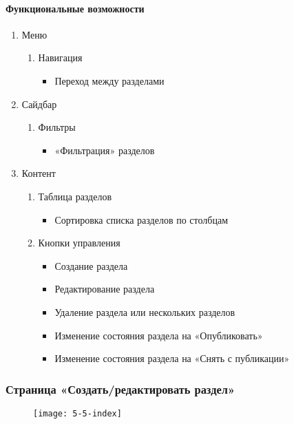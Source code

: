 \paragraph{Функциональные возможности}
\begin{enumerate}
	\item Меню
	\begin{enumerate}
		\item Навигация
		\begin{itemize}
			\item Переход между разделами
		\end{itemize}
	\end{enumerate}

	\item Сайдбар
	\begin{enumerate}
		\item Фильтры
		\begin{itemize}
			\item «Фильтрация» разделов
		\end{itemize}
	\end{enumerate}

	\item Контент
	\begin{enumerate}
		\item Таблица разделов
		\begin{itemize}
			\item Сортировка списка разделов по столбцам
		\end{itemize}

		\item Кнопки управления
		\begin{itemize}
			\item Создание раздела
			\item Редактирование раздела
			\item Удаление раздела или нескольких разделов
			\item Изменение состояния раздела на «Опубликовать»
			\item Изменение состояния раздела на «Снять с публикации»
		\end{itemize}
	\end{enumerate}
\end{enumerate}

\subsubsection{Страница «Создать/редактировать раздел»}
\begin{figure}[H]
	\texttt{[image: 5-5-index]}
\end{figure}
